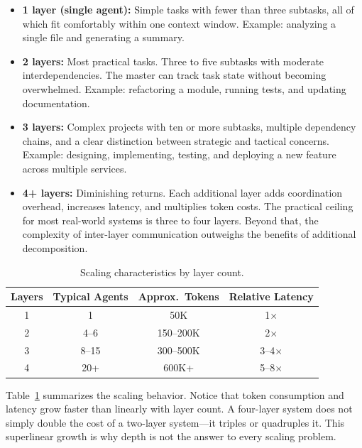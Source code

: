 \begin{itemize}
\item \textbf{1 layer (single agent):} Simple tasks with fewer than three subtasks, all of which fit comfortably within one context window. Example: analyzing a single file and generating a summary.

\item \textbf{2 layers:} Most practical tasks. Three to five subtasks with moderate interdependencies. The master can track task state without becoming overwhelmed. Example: refactoring a module, running tests, and updating documentation.

\item \textbf{3 layers:} Complex projects with ten or more subtasks, multiple dependency chains, and a clear distinction between strategic and tactical concerns. Example: designing, implementing, testing, and deploying a new feature across multiple services.

\item \textbf{4+ layers:} Diminishing returns. Each additional layer adds coordination overhead, increases latency, and multiplies token costs. The practical ceiling for most real-world systems is three to four layers. Beyond that, the complexity of inter-layer communication outweighs the benefits of additional decomposition.
\end{itemize}

\begin{table}[t]
\centering
\caption{Scaling characteristics by layer count.}
\label{tab:layer_tradeoffs}
\small
\begin{tabular}{@{} c c c c @{}}
\toprule
\textbf{Layers} & \textbf{Typical Agents} & \textbf{Approx.\ Tokens} & \textbf{Relative Latency} \\
\midrule
1 & 1 & 50K & 1$\times$ \\
2 & 4--6 & 150--200K & 2$\times$ \\
3 & 8--15 & 300--500K & 3--4$\times$ \\
4 & 20+ & 600K+ & 5--8$\times$ \\
\bottomrule
\end{tabular}
\end{table}

Table~\ref{tab:layer_tradeoffs} summarizes the scaling behavior. Notice that token consumption and latency grow faster than linearly with layer count. A four-layer system does not simply double the cost of a two-layer system—it triples or quadruples it. This superlinear growth is why depth is not the answer to every scaling problem.

